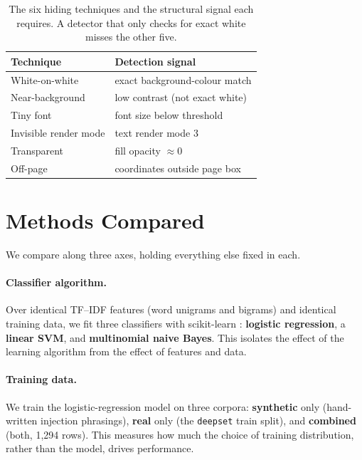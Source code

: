 \documentclass[11pt]{article}
\begin{document}
\begin{table}[t]
  \centering
  \small
  \begin{tabular}{ll}
    \toprule
    \textbf{Technique} & \textbf{Detection signal} \\
    \midrule
    White-on-white & exact background-colour match \\
    Near-background & low contrast (not exact white) \\
    Tiny font & font size below threshold \\
    Invisible render mode & text render mode 3 \\
    Transparent & fill opacity $\approx 0$ \\
    Off-page & coordinates outside page box \\
    \bottomrule
  \end{tabular}
  \caption{The six hiding techniques and the structural signal each requires.
  A detector that only checks for exact white misses the other five.}
  \label{tab:techniques}
\end{table}

\section{Methods Compared}
\label{sec:methods}

We compare along three axes, holding everything else fixed in each.

\paragraph{Classifier algorithm.} Over identical TF--IDF features
(word unigrams and bigrams) and identical training data, we fit three
classifiers with scikit-learn \citep{pedregosa2011scikit}: \textbf{logistic
regression}, a \textbf{linear SVM}, and \textbf{multinomial naive Bayes}. This isolates the effect of the learning
algorithm from the effect of features and data.

\paragraph{Training data.} We train the logistic-regression model on three
corpora: \textbf{synthetic} only (hand-written injection phrasings), \textbf{real}
only (the \texttt{deepset} train split), and \textbf{combined} (both, 1{,}294
rows). This measures how much the choice of training distribution, rather than
the model, drives performance.
\end{document}
